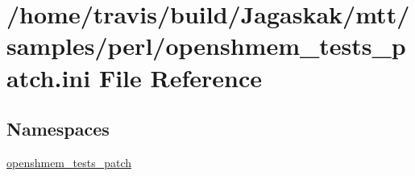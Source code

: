 \hypertarget{openshmem__tests__patch_8ini}{\section{/home/travis/build/\-Jagaskak/mtt/samples/perl/openshmem\-\_\-tests\-\_\-patch.ini File Reference}
\label{openshmem__tests__patch_8ini}
}
\subsection*{Namespaces}
\begin{DoxyCompactItemize}
\item 
\hyperlink{namespaceopenshmem__tests__patch}{openshmem\-\_\-tests\-\_\-patch}
\end{DoxyCompactItemize}
